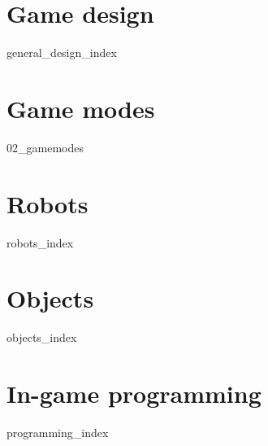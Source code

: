 \part{Game design} \newpage
{general_design_index}
\newpage

\part{Game modes} \newpage
{02_gamemodes}
\newpage

\part{Robots} \newpage
{robots_index}
\newpage

\part{Objects} \newpage
{objects_index}
\newpage

\part{In-game programming} \newpage
{programming_index}
\newpage